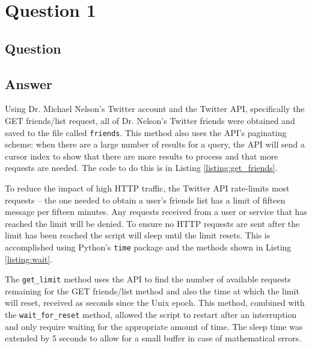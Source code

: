 \section{Question 1}

\subsection{Question}


\subsection{Answer}
Using Dr. Michael Nelson's Twitter account and the Twitter API\cite{api:twitter}, specifically the GET friends/list\cite{api:twitter_friendslist} request, all of Dr. Nelson's Twitter friends were obtained and saved to the file called {\tt friends}. This method also uses the API's paginating scheme: when there are a large number of results for a query, the API will send a cursor index to show that there are more results to process and that more requests are needed. The code to do this is in Listing \ref{listing:get_friends}. 



\clearpage

To reduce the impact of high HTTP traffic, the Twitter API rate-limits most requests -- the one needed to obtain a user's friends list has a limit of fifteen message per fifteen minutes. Any requests received from a user or service that has reached the limit will be denied. To ensure no HTTP requests are sent after the limit has been reached the script will sleep until the limit resets. This is accomplished using Python's {\tt time} package\cite{py:time} and the methods shown in Listing \ref{listing:wait}.



The {\tt get\_limit} method uses the API to find the number of available requests remaining for the GET friends/list method and also the time at which the limit will reset, received as seconds since the Unix epoch\cite{misc:stack_unixepoch}. This method, combined with the {\tt wait\_for\_reset} method, allowed the script to restart after an interruption and only require waiting for the appropriate amount of time. The sleep time was extended by 5 seconds to allow for a small buffer in case of mathematical errors.\\

